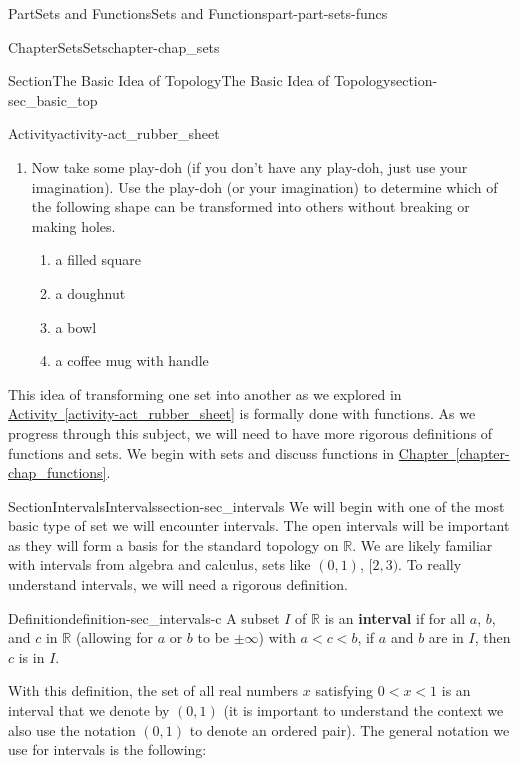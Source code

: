 \documentclass[oneside,10pt,]{book}
\newcommand{\xreffont}{\relax}
\newcommand{\mono}[1]{\texttt{#1}}
\newcommand{\terminology}[1]{\textbf{#1}}
\numberwithin{equation}{chapter}
\newcommand{\R}{\mathbb{R}}
\newcommand{\lt}{<}
\begin{document}
\begin{partptx}{Part}{Sets and Functions}{}{Sets and Functions}{}{}{part-part-sets-funcs}
\begin{chapterptx}{Chapter}{Sets}{}{Sets}{}{}{chapter-chap_sets}
\begin{sectionptx}{Section}{The Basic Idea of Topology}{}{The Basic Idea of Topology}{}{}{section-sec_basic_top}
\begin{activity}{Activity}{}{activity-act_rubber_sheet}
\begin{enumerate}[font=\bfseries,label=(\alph*),ref=\alph*]
\begin{enumerate}[font=\bfseries,label=(\roman*),ref=\theenumi.\roman*]
\item{}a five point star ☆%
\item{}the letter \mono{D}%
\end{enumerate}%
\item{}Now take some play-doh (if you don't have any play-doh, just use your imagination). Use the play-doh (or your imagination) to determine which of the following shape can be transformed into others without breaking or making holes.%
\begin{enumerate}[font=\bfseries,label=(\roman*),ref=\theenumi.\roman*]%
\item{}a filled square%
\item{}a doughnut%
\item{}a bowl%
\item{}a coffee mug with handle%
\end{enumerate}%
\end{enumerate}%
\end{activity}%
This idea of transforming one set into another as we explored in \hyperref[activity-act_rubber_sheet]{Activity~{\xreffont\ref{activity-act_rubber_sheet}}} is formally done with functions. As we progress through this subject, we will need to have more rigorous definitions of functions and sets. We begin with sets and discuss functions in \hyperref[chapter-chap_functions]{Chapter~{\xreffont\ref{chapter-chap_functions}}}.%
\end{sectionptx}
%
%
\typeout{************************************************}
\typeout{************************************************}
%
\begin{sectionptx}{Section}{Intervals}{}{Intervals}{}{}{section-sec_intervals}
We will begin with one of the most basic type of set we will encounter \textemdash{} intervals. The open intervals will be important as they will form a basis for the standard topology on \(\R\). We are likely familiar with intervals from algebra and calculus, sets like \((0,1)\), \([2,3)\). To really understand intervals, we will need a rigorous definition.%
\begin{definition}{Definition}{}{definition-sec_intervals-c}%
%
A subset \(I\) of \(\R\) is an \terminology{interval} if for all \(a\), \(b\), and \(c\) in \(\R\) (allowing for \(a\) or \(b\) to be \(\pm \infty\)) with \(a \lt c \lt b\), if \(a\) and \(b\) are in \(I\), then \(c\) is in \(I\).%
\end{definition}
With this definition, the set of all real numbers \(x\) satisfying \(0 \lt  x \lt  1\) is an interval that we denote by \((0,1)\) (it is important to understand the context \textemdash{} we also use the notation \((0,1)\) to denote an ordered pair). The general notation we use for intervals is the following:%

\end{sectionptx}
\end{chapterptx}
\end{partptx}
\end{document}

